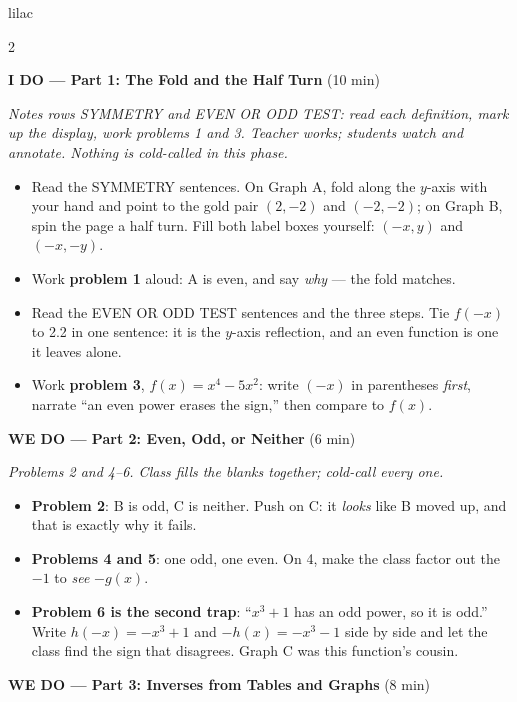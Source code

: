 \documentclass[10pt]{article}
\begin{document}
\begin{skillbox}{lilac}
\begin{multicols}{2}

\textbf{I DO --- Part 1: The Fold and the Half Turn} (10 min)

\textit{Notes rows SYMMETRY and EVEN OR ODD TEST: read each definition, mark up the display,
work problems 1 and 3. Teacher works; students watch and annotate. Nothing is cold-called in
this phase.}
\begin{itemize}
  \item Read the SYMMETRY sentences. On Graph A, fold along the $y$-axis with your hand and
        point to the gold pair $(2, -2)$ and $(-2, -2)$; on Graph B, spin the page a half
        turn. Fill both label boxes yourself: $(-x, y)$ and $(-x, -y)$.
  \item Work \textbf{problem 1} aloud: A is even, and say \textit{why} --- the fold matches.
  \item Read the EVEN OR ODD TEST sentences and the three steps. Tie $f(-x)$ to 2.2 in one
        sentence: it is the $y$-axis reflection, and an even function is one it leaves alone.
  \item Work \textbf{problem 3}, $f(x) = x^4 - 5x^2$: write $(-x)$ in parentheses
        \textit{first}, narrate ``an even power erases the sign,'' then compare to $f(x)$.
\end{itemize}

\textbf{WE DO --- Part 2: Even, Odd, or Neither} (6 min)

\textit{Problems 2 and 4--6. Class fills the blanks together; cold-call every one.}
\begin{itemize}
  \item \textbf{Problem 2}: B is odd, C is neither. Push on C: it \textit{looks} like B moved
        up, and that is exactly why it fails.
  \item \textbf{Problems 4 and 5}: one odd, one even. On 4, make the class factor out the
        $-1$ to \textit{see} $-g(x)$.
  \item \textbf{Problem 6 is the second trap}: ``$x^3 + 1$ has an odd power, so it is odd.''
        Write $h(-x) = -x^3 + 1$ and $-h(x) = -x^3 - 1$ side by side and let the class find
        the sign that disagrees. Graph C was this function's cousin.
\end{itemize}

\columnbreak

\textbf{WE DO --- Part 3: Inverses from Tables and Graphs} (8 min)


\end{multicols}
\end{skillbox}
\end{document}
